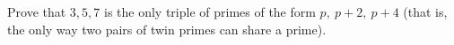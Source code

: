 Prove that $3,5,7$ is the only triple of primes of the form $p,\ p+2,\ p+4$ (that is, the only way two pairs of twin primes can share a prime).
